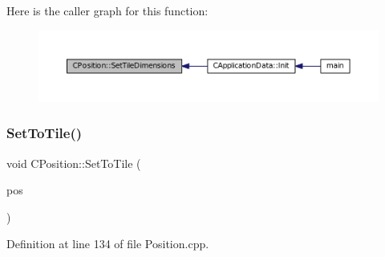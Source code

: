 Here is the caller graph for this function\+:\nopagebreak
\begin{figure}[H]
\begin{center}
\leavevmode
\includegraphics[width=350pt]{classCPosition_a506e9efd21e209e36533ba7e594be75f_icgraph}
\end{center}
\end{figure}
\hypertarget{classCPosition_ae302aa21792de64c97de29e2cbbfeb94}{}\label{classCPosition_ae302aa21792de64c97de29e2cbbfeb94} 
\subsubsection{\texorpdfstring{Set\+To\+Tile()}{SetToTile()}}
{\footnotesize\ttfamily void C\+Position\+::\+Set\+To\+Tile (\begin{DoxyParamCaption}\item[{const \hyperlink{classCPosition}{C\+Position} \&}]{pos }\end{DoxyParamCaption})}



Definition at line 134 of file Position.\+cpp.


